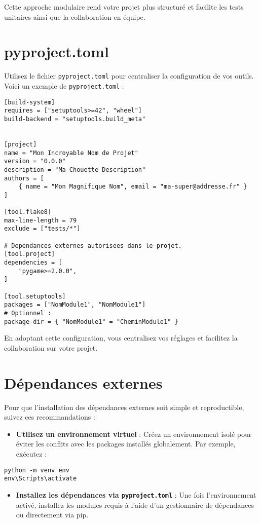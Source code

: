 \documentclass[a4paper,12pt]{article}
\begin{document}
Cette approche modulaire rend votre projet plus structuré et facilite les tests unitaires ainsi que la collaboration en équipe.
\section{pyproject.toml}

Utilisez le fichier \texttt{pyproject.toml} pour centraliser la configuration de vos outils. Voici un exemple de \texttt{pyproject.toml} :

\begin{lstlisting}
[build-system]
requires = ["setuptools>=42", "wheel"]
build-backend = "setuptools.build_meta"


[project]
name = "Mon Incroyable Nom de Projet"
version = "0.0.0"
description = "Ma Chouette Description"
authors = [
    { name = "Mon Magnifique Nom", email = "ma-super@addresse.fr" }
]

[tool.flake8]
max-line-length = 79
exclude = ["tests/*"]

# Dependances externes autorisees dans le projet.
[tool.project]
dependencies = [
    "pygame>=2.0.0",
]

[tool.setuptools]
packages = ["NomModule1", "NomModule1"]
# Optionnel : 
package-dir = { "NomModule1" = "CheminModule1" }
\end{lstlisting}

En adoptant cette configuration, vous centralisez vos réglages et facilitez la collaboration sur votre projet.


\section{Dépendances externes}

Pour que l'installation des dépendances externes soit simple et reproductible, suivez ces recommandations :

\begin{itemize}
    \item \textbf{Utilisez un environnement virtuel} : Créez un environnement isolé pour éviter les conflits avec les packages installés globalement. Par exemple, exécutez :
\end{itemize}

\begin{lstlisting}
python -m venv env
env\Scripts\activate
\end{lstlisting}

\begin{itemize}
    \item \textbf{Installez les dépendances via \texttt{pyproject.toml}} : Une fois l'environnement activé, installez les modules requis à l'aide d'un gestionnaire de dépendances ou directement via pip.
\end{itemize}
\end{document}
